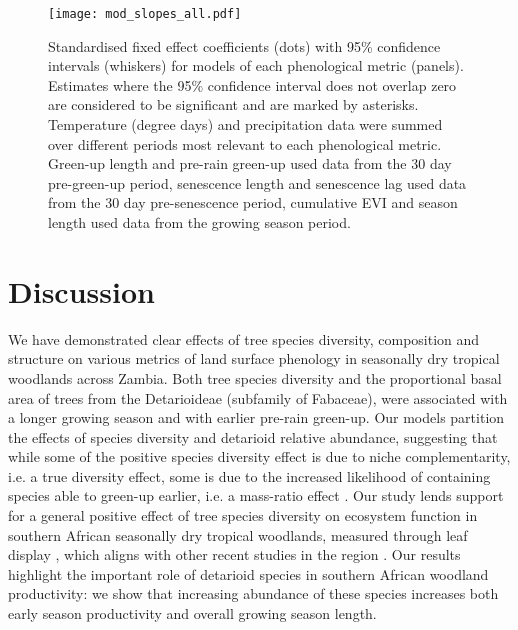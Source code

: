 \documentclass[11pt,a4paper]{article}
\begin{document}
\begin{figure}[H]
\centering
	\texttt{[image: mod\_slopes\_all.pdf]}
	\caption{Standardised fixed effect coefficients (dots) with 95\% confidence
		intervals (whiskers) for models of each phenological metric (panels).
		Estimates where the 95\% confidence interval does not overlap zero are
		considered to be significant and are marked by asterisks. Temperature (degree
		days) and precipitation data were summed over different periods most relevant
		to each phenological metric. Green-up length and pre-rain green-up used data
		from the 30 day pre-green-up period, senescence length and senescence lag used
		data from the 30 day pre-senescence period, cumulative EVI and season length
		used data from the growing season period.}
	\label{mod_slopes}
\end{figure}

\section{Discussion}

We have demonstrated clear effects of tree species diversity, composition and
structure on various metrics of land surface phenology in seasonally dry
tropical woodlands across Zambia. Both tree species diversity and the
proportional basal area of trees from the Detarioideae (subfamily of Fabaceae),
were associated with a longer growing season and with earlier pre-rain
green-up. Our models partition the effects of species diversity and detarioid
relative abundance, suggesting that while some of the positive species
diversity effect is due to niche complementarity, i.e. a true diversity effect,
some is due to the increased likelihood of containing species able to green-up
earlier, i.e. a mass-ratio effect \citep{Grime1998, Tilman2014}. Our study
lends support for a general positive effect of tree species diversity on
ecosystem function in southern African seasonally dry tropical woodlands,
measured through leaf display \citep{Richardson2009}, which aligns with other
recent studies in the region \citep{Godlee2021, McNicol2018, Shirima2015}. Our
results highlight the important role of detarioid species in southern African
woodland productivity: we show that increasing abundance of these species
increases both early season productivity and overall growing season length.
\end{document}
